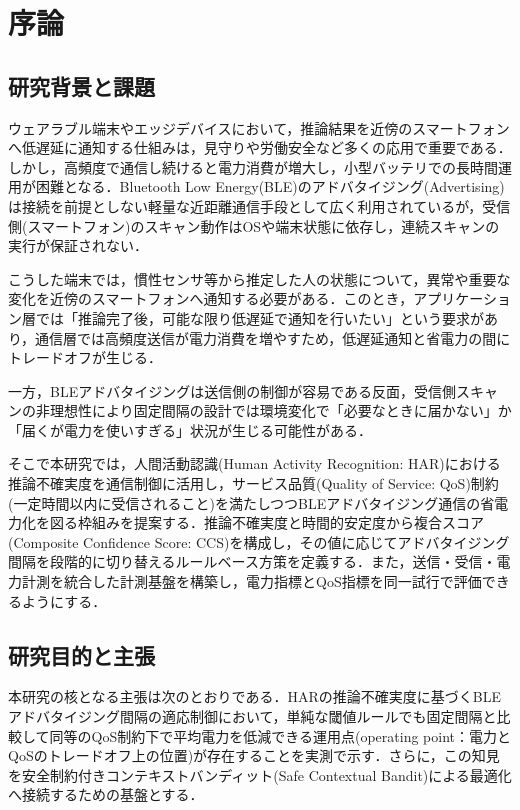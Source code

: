 ﻿%
\chapter{序論}
\label{ch:introduction}
\clearpage

\section{研究背景と課題}
ウェアラブル端末やエッジデバイスにおいて，推論結果を近傍のスマートフォンへ低遅延に通知する仕組みは，見守りや労働安全など多くの応用で重要である．しかし，高頻度で通信し続けると電力消費が増大し，小型バッテリでの長時間運用が困難となる．Bluetooth Low Energy(BLE)のアドバタイジング(Advertising)は接続を前提としない軽量な近距離通信手段として広く利用されているが，受信側(スマートフォン)のスキャン動作はOSや端末状態に依存し，連続スキャンの実行が保証されない．

こうした端末では，慣性センサ等から推定した人の状態について，異常や重要な変化を近傍のスマートフォンへ通知する必要がある．このとき，アプリケーション層では「推論完了後，可能な限り低遅延で通知を行いたい」という要求があり，通信層では高頻度送信が電力消費を増やすため，低遅延通知と省電力の間にトレードオフが生じる．

一方，BLEアドバタイジングは送信側の制御が容易である反面，受信側スキャンの非理想性により固定間隔の設計では環境変化で「必要なときに届かない」か「届くが電力を使いすぎる」状況が生じる可能性がある．

そこで本研究では，人間活動認識(Human Activity Recognition: HAR)における推論不確実度を通信制御に活用し，サービス品質(Quality of Service: QoS)制約(一定時間以内に受信されること)を満たしつつBLEアドバタイジング通信の省電力化を図る枠組みを提案する．推論不確実度と時間的安定度から複合スコア(Composite Confidence Score: CCS)を構成し，その値に応じてアドバタイジング間隔を段階的に切り替えるルールベース方策を定義する．また，送信・受信・電力計測を統合した計測基盤を構築し，電力指標とQoS指標を同一試行で評価できるようにする．

\section{研究目的と主張}
本研究の核となる主張は次の\mbox{とおりである}．HARの推論不確実度に基づくBLEアドバタイジング間隔の適応制御において，単純な閾値ルールでも固定間隔と比較して同等のQoS制約下で平均電力を低減できる運用点(operating point：電力とQoSのトレードオフ上の位置)が存在することを実測で示す．さらに，この知見を安全制約付きコンテキストバンディット(Safe Contextual Bandit)による最適化へ接続するための基盤とする．

